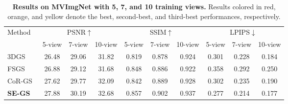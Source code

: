 \documentclass[letterpaper]{article} %
\begin{document}
\begin{table*}[!t]   
  \centering
  \begin{tabular}{@{}l|ccc|ccc|ccc}
    \toprule
     \multirow{2}{*}{Method}   & \multicolumn{3}{c|}{PSNR$\uparrow$}  & \multicolumn{3}{c|}{SSIM$\uparrow$}   & \multicolumn{3}{c}{LPIPS$\downarrow$} \\
      &  5-view & 7-view & 10-view & 5-view & 7-view & 10-view & 5-view & 7-view & 10-view \\
    \midrule
    3DGS~\cite{kerbl20233d} & 26.48 & 29.06 & \cellcolor[HTML]{FFFFD4}31.82 & 0.819 & 0.878 & \cellcolor[HTML]{FFFFD4}0.924 & \cellcolor[HTML]{FFE4CF}0.301 & \cellcolor[HTML]{FFE4CF}0.228 & \cellcolor[HTML]{FFE4CF}0.184 \\
    FSGS~\cite{zhu2024fsgs} & \cellcolor[HTML]{FFFFD4}26.88 & \cellcolor[HTML]{FFFFD4}29.12 & 31.68 & \cellcolor[HTML]{FFE4CF}0.848 & \cellcolor[HTML]{FFFFD4}0.886 & 0.922 & 0.358 & 0.292 & 0.250  \\
    CoR-GS~\cite{zhang2024cor} & \cellcolor[HTML]{FFE4CF}27.62 & \cellcolor[HTML]{FFE4CF}29.77 & \cellcolor[HTML]{FFE4CF}32.09 & \cellcolor[HTML]{FFFFD4}0.842 & \cellcolor[HTML]{FFE4CF}0.889 & \cellcolor[HTML]{FFE4CF}0.928 & \cellcolor[HTML]{FFFFD4}0.302 & \cellcolor[HTML]{FFFFD4}0.235 & \cellcolor[HTML]{FFFFD4}0.190 \\
    \textbf{SE-GS} & \cellcolor[HTML]{FFCCC9}27.88 & \cellcolor[HTML]{FFCCC9}30.19 & \cellcolor[HTML]{FFCCC9}32.68 & \cellcolor[HTML]{FFCCC9}0.857 & \cellcolor[HTML]{FFCCC9}0.902 & \cellcolor[HTML]{FFCCC9}0.937 & \cellcolor[HTML]{FFCCC9}0.277 & \cellcolor[HTML]{FFCCC9}0.214 & \cellcolor[HTML]{FFCCC9}0.177 \\
  \bottomrule
  \end{tabular}
  
  \caption{\textbf{Results on MVImgNet with 5, 7, and 10 training views.} Results colored in red, orange, and yellow denote the best, second-best, and third-best performances, respectively.}
  \label{tab:mvimgnet}
\end{table*}
\end{document}
